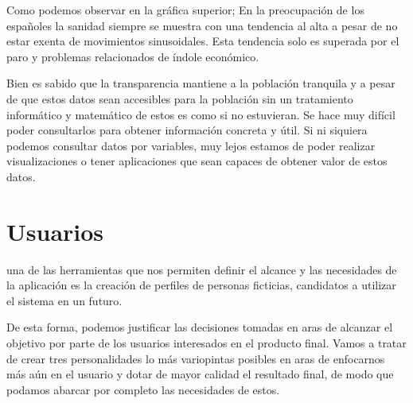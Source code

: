 Como podemos observar en la gráfica superior; En la preocupación de los españoles la sanidad siempre se muestra con una
tendencia al alta a pesar de no estar exenta de movimientos sinusoidales. Esta tendencia solo es superada por el paro y
problemas relacionados de índole económico.

Bien es sabido que la transparencia mantiene a la población tranquila y a pesar de que estos datos
sean accesibles para la población sin un tratamiento informático y matemático de estos es como si no estuvieran. Se hace
muy difícil poder consultarlos para obtener información concreta y útil. Si ni siquiera podemos consultar datos por
variables, muy lejos estamos de poder realizar visualizaciones o tener aplicaciones que sean capaces de obtener valor de
estos datos.

\section{Usuarios}
\label{sec:usu}
una de las herramientas que nos permiten definir el alcance y las necesidades de la aplicación es la creación de
perfiles de personas ficticias, candidatos a utilizar el sistema en un futuro.

De esta forma, podemos justificar las decisiones tomadas en aras de alcanzar el objetivo por parte de los usuarios
interesados en el producto final. Vamos a tratar de crear tres personalidades lo más variopintas posibles en aras
de enfocarnos más aún en el usuario y dotar de mayor calidad el resultado final, de modo que podamos abarcar por
completo las necesidades de estos.

